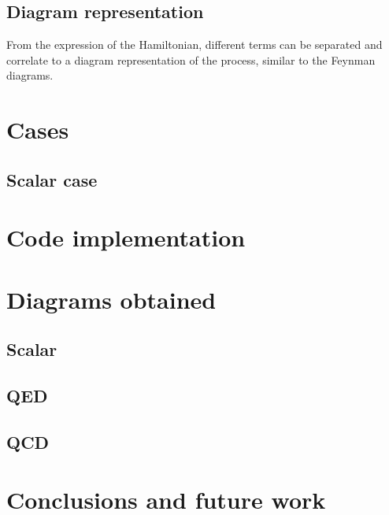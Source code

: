 \documentclass[11pt,a4paper,twoside,pdf]{article}
\numberwithin{equation}{section}
\begin{document}
\subsection{Diagram representation}

From the expression of the Hamiltonian, different terms can be separated and correlate
to a diagram representation of the process, similar to the Feynman diagrams.




\section{Cases} \label{sec:cases}
\subsection{Scalar case}


\section{Code implementation} \label{sec:code}

\section{Diagrams obtained} \label{sec:diagrams}

\subsection{Scalar}

\subsection{QED}

\subsection{QCD}

\section{Conclusions and future work} \label{sec:conclusions}



\newpage

\nocite{QFT}
\nocite{QCDG}
\end{document}
